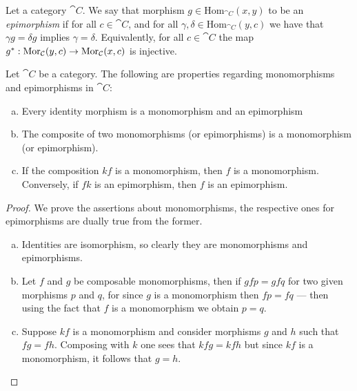 \begin{definition}[Epimorphism]\label{def: epimorphism}
  Let a category \(\cat C\). We say that morphism \(g \in \mathrm{Hom}_{\cat
  C}(x, y)\) to be an \emph{epimorphism} if for all \(c \in \cat{C}\), and for
  all \(\gamma, \delta \in \mathrm{Hom}_{\cat C}(y, c)\) we have that \(\gamma g
  = \delta g\) implies \(\gamma = \delta\). Equivalently, for all \(c \in \cat
  C\) the map \(g^*: \operatorname{Mor}_{\mathcal C}(y, c)\to \operatorname{Mor}_{\mathcal C}(x, c)\) is injective.
\end{definition}

\begin{proposition}
\label{prop:}
Let \(\cat C\) be a category. The following are properties regarding
monomorphisms and epimorphisms in \(\cat C\):
\begin{enumerate}[(a)]\setlength\itemsep{0em}
\item Every identity morphism is a monomorphism and an epimorphism
\item The composite of two monomorphisms (or epimorphisms) is a monomorphism (or
  epimorphism).
\item If the composition \(k f\) is a monomorphism, then \(f\) is a
  monomorphism. Conversely, if \(f k\) is an epimorphism, then \(f\) is an
  epimorphism.
\end{enumerate}
\end{proposition}

\begin{proof}
We prove the assertions about monomorphisms, the respective ones for
epimorphisms are dually true from the former.
\begin{enumerate}[(a)]\setlength\itemsep{0em}
\item Identities are isomorphism, so clearly they are monomorphisms and
  epimorphisms.

\item Let \(f\) and \(g\) be composable monomorphisms, then if \(g f p = g f q\)
  for two given morphisms \(p\) and \(q\), for since \(g\) is a monomorphism
  then \(f p = f q\) --- then using the fact that \(f\) is a monomorphism we
  obtain \(p = q\).

\item Suppose \(k f\) is a monomorphism and consider morphisms \(g\) and \(h\)
  such that \(f g = f h\). Composing with \(k\) one sees that \(k f g = k f h\)
  but since \(k f\) is a monomorphism, it follows that \(g = h\).
\end{enumerate}
\end{proof}

